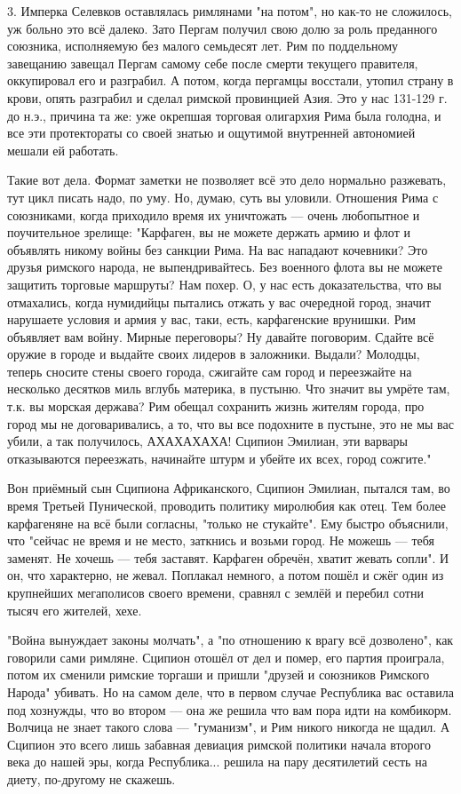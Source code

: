 3. Имперка Селевков оставлялась римлянами "на потом", но как-то не сложилось, уж больно это всё далеко. Зато Пергам получил свою долю за роль преданного союзника, исполняемую без малого семьдесят лет. Рим по поддельному завещанию завещал Пергам самому себе после смерти текущего правителя, оккупировал его и разграбил. А потом, когда пергамцы восстали, утопил страну в крови, опять разграбил и сделал римской провинцией Азия. Это у нас 131-129 г. до н.э., причина та же: уже окрепшая торговая олигархия Рима была голодна, и все эти протектораты со своей знатью и ощутимой внутренней автономией мешали ей работать.


Такие вот дела. Формат заметки не позволяет всё это дело нормально разжевать, тут цикл писать надо, по уму. Но, думаю, суть вы уловили. Отношения Рима с союзниками, когда приходило время их уничтожать — очень любопытное и поучительное зрелище: "Карфаген, вы не можете держать армию и флот и объявлять никому войны без санкции Рима. На вас нападают кочевники? Это друзья римского народа, не выпендривайтесь. Без военного флота вы не можете защитить торговые маршруты? Нам похер. О, у нас есть доказательства, что вы отмахались, когда нумидийцы пытались отжать у вас очередной город, значит нарушаете условия и армия у вас, таки, есть, карфагенские врунишки. Рим объявляет вам войну. Мирные переговоры? Ну давайте поговорим. Сдайте всё оружие в городе и выдайте своих лидеров в заложники. Выдали? Молодцы, теперь сносите стены своего города, сжигайте сам город и переезжайте на несколько десятков миль вглубь материка, в пустыню. Что значит вы умрёте там, т.к. вы морская держава? Рим обещал сохранить жизнь жителям города, про город мы не договаривались, а то, что вы все подохните в пустыне, это не мы вас убили, а так получилось, АХАХАХАХА! Сципион Эмилиан, эти варвары отказываются переезжать, начинайте штурм и убейте их всех, город сожгите."


Вон приёмный сын Сципиона Африканского, Сципион Эмилиан, пытался там, во время Третьей Пунической, проводить политику миролюбия как отец. Тем более карфагеняне на всё были согласны, "только не стукайте". Ему быстро объяснили, что "сейчас не время и не место, заткнись и возьми город. Не можешь — тебя заменят. Не хочешь — тебя заставят. Карфаген обречён, хватит жевать сопли". И он, что характерно, не жевал. Поплакал немного, а потом пошёл и сжёг один из крупнейших мегаполисов своего времени, сравнял с землёй и перебил сотни тысяч его жителей, хехе.


"Война вынуждает законы молчать", а "по отношению к врагу всё дозволено", как говорили сами римляне. Сципион отошёл от дел и помер, его партия проиграла, потом их сменили римские торгаши и пришли "друзей и союзников Римского Народа" убивать. Но на самом деле, что в первом случае Республика вас оставила под хознужды, что во втором — она же решила что вам пора идти на комбикорм. Волчица не знает такого слова — "гуманизм", и Рим никого никогда не щадил. А Сципион это всего лишь забавная девиация римской политики начала второго века до нашей эры, когда Республика... решила на пару десятилетий сесть на диету, по-другому не скажешь.


